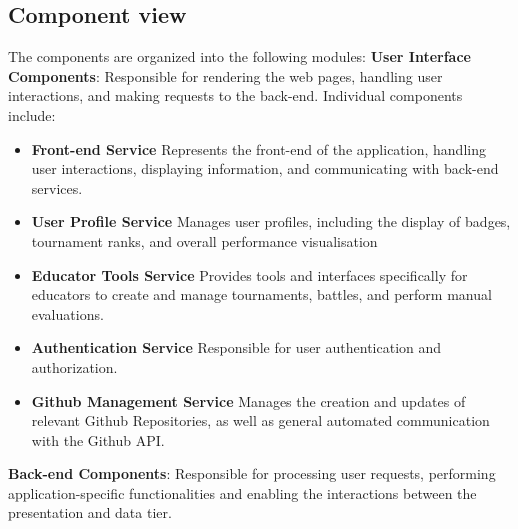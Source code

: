 \subsection{Component view}
The components are organized into the following modules: \bigskip  \newline \textbf{User Interface Components}: \newline
 Responsible for rendering the web pages, handling user interactions, and making requests to the back-end. Individual components include:
\begin{itemize}
    \item \textbf{Front-end Service} \newline
    Represents the front-end of the application, handling user interactions, displaying information, and communicating with back-end services.
    \item \textbf{User Profile Service} \newline
    Manages user profiles, including the display of badges, tournament ranks, and overall performance visualisation
    \item \textbf{Educator Tools Service} \newline
    Provides tools and interfaces specifically for educators to create and manage tournaments, battles, and perform manual evaluations.
    \item \textbf{Authentication Service}
         \newline Responsible for user authentication and authorization.

    \item \textbf{Github Management Service}
        \newline Manages the creation and updates of relevant Github Repositories, as well as general automated communication with the Github API.
\end{itemize}
\textbf{Back-end Components}: \newline
 Responsible for processing user requests, performing application-specific functionalities and enabling the interactions between the presentation and data tier.
